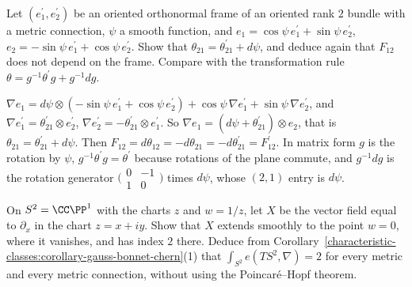 \begin{exercise}\label{characteristic-classes:exercise-rotation-gauge}
Let $(e^{\prime}_1, e^{\prime}_2)$ be an oriented orthonormal frame of an oriented rank $2$ bundle with a metric connection, $\psi$ a smooth function, and
$e_1 = \cos\psi\,e^{\prime}_1 + \sin\psi\,e^{\prime}_2$, $e_2 = -\sin\psi\,e^{\prime}_1 + \cos\psi\,e^{\prime}_2$. Show that $\theta_{21} = \theta^{\prime}_{21} + d\psi$, and deduce again that $F_{12}$ does not
depend on the frame. Compare with the transformation rule $\theta = g^{-1}\theta^{\prime}g + g^{-1}dg$.
\end{exercise}

\begin{solution}
$\nabla e_1 = d\psi \otimes (-\sin\psi\,e^{\prime}_1 + \cos\psi\,e^{\prime}_2) + \cos\psi\,\nabla e^{\prime}_1 + \sin\psi\,\nabla e^{\prime}_2$, and $\nabla e^{\prime}_1 = \theta^{\prime}_{21} \otimes e^{\prime}_2$,
$\nabla e^{\prime}_2 = -\theta^{\prime}_{21} \otimes e^{\prime}_1$. So $\nabla e_1 = (d\psi + \theta^{\prime}_{21}) \otimes e_2$, that is $\theta_{21} = \theta^{\prime}_{21} + d\psi$. Then
$F_{12} = d\theta_{12} = -d\theta_{21} = -d\theta^{\prime}_{21} = F^{\prime}_{12}$. In matrix form $g$ is the rotation by $\psi$, $g^{-1}\theta^{\prime}g = \theta^{\prime}$ because rotations of the plane commute, and
$g^{-1}dg$ is the rotation generator $\bigl(\begin{smallmatrix} 0 & -1\\ 1 & 0\end{smallmatrix}\bigr)$ times $d\psi$, whose $(2,1)$ entry is $d\psi$.
\end{solution}

\begin{exercise}\label{characteristic-classes:exercise-one-zero-sphere}
On $S^2 = \CC\PP^1$ with the charts $z$ and $w = 1/z$, let $X$ be the vector field equal to $\partial_x$ in the chart $z = x + iy$. Show that $X$ extends smoothly to the point $w = 0$, where it
vanishes, and has index $2$ there. Deduce from Corollary~\ref{characteristic-classes:corollary-gauss-bonnet-chern}(1) that $\int_{S^2}e(TS^2, \nabla) = 2$ for every metric and every metric
connection, without using the Poincar\'e--Hopf theorem.
\end{exercise}

